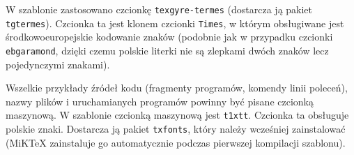 W szablonie zastosowano czcionkę \texttt{texgyre-termes} (dostarcza ją pakiet \texttt{tgtermes}). Czcionka ta jest klonem czcionki \texttt{Times}, w którym obsługiwane jest środkowoeuropejskie kodowanie znaków (podobnie jak w przypadku czcionki \texttt{ebgaramond}, dzięki czemu polskie literki nie są zlepkami dwóch znaków lecz pojedynczymi znakami).  

Wszelkie przykłady źródeł kodu (fragmenty programów, komendy linii poleceń), nazwy plików i uruchamianych programów powinny być pisane czcionką maszynową. W szablonie czcionką maszynową jest \texttt{t1xtt}. Czcionka ta obsługuje polskie znaki. Dostarcza ją pakiet \texttt{txfonts}, który należy wcześniej zainstalować (MiKTeX zainstaluje go automatycznie podczas pierwszej kompilacji szablonu).   



